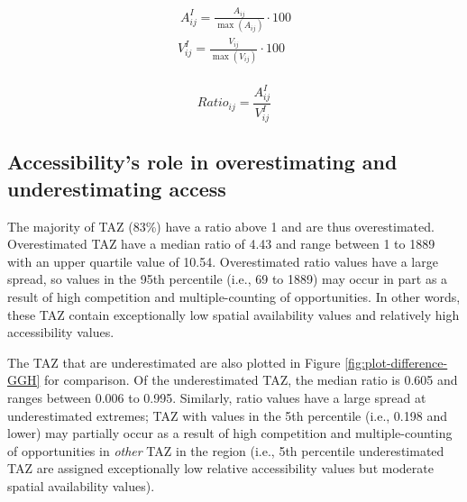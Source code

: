 \documentclass[]{elsarticle} %
\begin{document}
\begin{equation}
\label{eq:index-measures}
\begin{array}{l}\
A^I_{ij} = \frac{A_{ij}}{\max(A_{ij})}\cdot100\\
V^I_{ij} = \frac{V_{ij}}{\max(V_{ij})}\cdot100\\
\end{array}
\end{equation}

\begin{equation}
\label{eq:dif-index-measures}
Ratio_{ij} = \frac{A^I_{ij}}{V^I_{ij}}
\end{equation}

\hypertarget{accessibilitys-role-in-overestimating-and-underestimating-access}{%
\subsection{Accessibility's role in overestimating and underestimating
access}\label{accessibilitys-role-in-overestimating-and-underestimating-access}}

The majority of TAZ (83\%) have a ratio above 1 and are thus
overestimated. Overestimated TAZ have a median ratio of 4.43 and range
between 1 to 1889 with an upper quartile value of 10.54. Overestimated
ratio values have a large spread, so values in the 95th percentile
(i.e., 69 to 1889) may occur in part as a result of high competition and
multiple-counting of opportunities. In other words, these TAZ contain
exceptionally low spatial availability values and relatively high
accessibility values.

The TAZ that are underestimated are also plotted in Figure
\ref{fig:plot-difference-GGH} for comparison. Of the underestimated TAZ,
the median ratio is 0.605 and ranges between 0.006 to 0.995. Similarly,
ratio values have a large spread at underestimated extremes; TAZ with
values in the 5th percentile (i.e., 0.198 and lower) may partially occur
as a result of high competition and multiple-counting of opportunities
in \emph{other} TAZ in the region (i.e., 5th percentile underestimated
TAZ are assigned exceptionally low relative accessibility values but
moderate spatial availability values).
\end{document}
